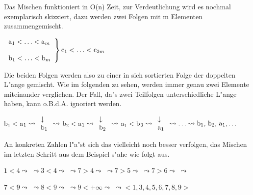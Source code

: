 \documentclass[draft,12pt]{scrreprt}
\theoremstyle{break}
\begin{document}
Das Mischen funktioniert in O(n) Zeit, zur Verdeutlichung wird es nochmal exemplarisch skizziert, dazu werden zwei Folgen mit m
Elementen zusammengemischt.

$\left. 
\begin{array}{l}
{\textrm{\textup{a}}}_1<\ldots<{\textrm{\textup{a}}}_m\\
\phantom{leer}\\
{\textrm{\textup{b}}}_1<\ldots<{\textrm{\textup{b}}}_m
\end{array}
\right\} {\textrm{\textup{c}}}_1<\ldots<{\textrm{\textup{c}}}_{2m}$
\bigskip

Die beiden Folgen werden also zu einer in sich sortierten Folge der doppelten L"ange gemischt. Wie im folgenden zu sehen, werden immer genau
zwei Elemente miteinander verglichen. Der Fall, da"s zwei Teilfolgen unterschiedliche L"ange haben, kann o.B.d.A. ignoriert werden.
\bigskip

b$_1<$a$_1 \leadsto \begin{array}{l}
\downarrow\\
{\textrm{\textup{b}}}_1
\end{array} \leadsto$
b$_2<$a$_1 \leadsto \begin{array}{l}
\downarrow\\
{\textrm{\textup{b}}}_2
\end{array} \leadsto$
a$_1<$b$_3 \leadsto \begin{array}{l}
\downarrow\\
{\textrm{\textup{a}}}_1
\end{array} \leadsto \ldots \leadsto {\textrm{\textup{b}}}_1, \, {\textrm{\textup{b}}}_2, \, {\textrm{\textup{a}}}_1, \ldots$
\bigskip

An konkreten Zahlen l"a"st sich das vielleicht noch besser verfolgen, das Mischen im letzten Schritt aus dem Beispiel s"ahe wie folgt aus.
\bigskip

$1<4 \leadsto$  $\leadsto
3<4 \leadsto$  $\leadsto
7>4 \leadsto$  $\leadsto 
7>5 \leadsto$  $\leadsto
7>6 \leadsto$  $\leadsto$
\medskip

$7<9 \leadsto$  $\leadsto
8<9 \leadsto$  $\leadsto
9<+\infty \leadsto$  $
\leadsto<1,3,4,5,6,7,8,9>$
\medskip
\end{document}
